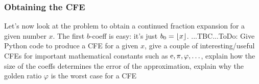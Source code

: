 %









\subsubsection{Obtaining the CFE}
Let's now look at the problem to obtain a continued fraction expansion for a given number $x$. The first $b$-coeff is easy: it's just $b_0 = \lfloor x\rfloor$. ...TBC...ToDo: Give Python code to produce a CFE for a given $x$, give a couple of interesting/useful CFEs for important mathematical constants such as $\operatorname{\mathrm{e}}, \pi, \varphi, \ldots$, explain how the size of the coeffs determines the error of the approximation, explain why the golden ratio $\varphi$ is the worst case for a CFE


